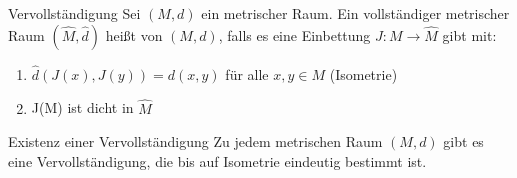 	\begin{karte}{Vervollständigung}
			Sei $(M, d)$ ein metrischer Raum. Ein vollständiger metrischer Raum $(\hat M, \hat d)$ hei{\ss}t  von $(M, d)$, falls es eine Einbettung $J \colon M \rightarrow \hat M$ gibt mit:
		\begin{enumerate}[label=\roman*\upshape)]
			\item $\hat d (J(x), J(y)) = d(x, y)$ für alle $x, y \in M$ (Isometrie)
			\item J(M) ist dicht in $\hat{M}$
		\end{enumerate}
	\end{karte}
	
	\begin{karte}{Existenz einer Vervollständigung}
		Zu jedem metrischen Raum $(M, d)$ gibt es eine Vervollständigung, die bis auf Isometrie eindeutig bestimmt ist.	
	\end{karte}

